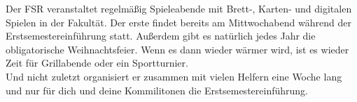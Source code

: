 Der FSR veranstaltet regelmäßig Spieleabende mit Brett-, Karten- und digitalen Spielen in der Fakultät. Der erste findet bereits am Mittwochabend während der Erstsemestereinführung statt.
Außerdem gibt es natürlich jedes Jahr die obligatorische Weihnachtsfeier.
Wenn es dann wieder wärmer wird, ist es wieder Zeit für Grillabende oder ein Sportturnier. \\

Und nicht zuletzt organisiert er zusammen mit vielen Helfern eine Woche lang und nur für dich und deine Kommilitonen die Erstsemestereinführung.

\newpage
\mbox{}
\thispagestyle{empty}

\newpage

